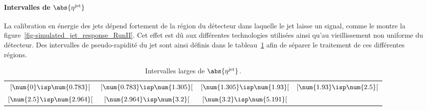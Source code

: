 \paragraph{Intervalles de $\abs{\eta^\text{jet}}$}
La calibration en énergie des jets dépend fortement de la région du détecteur dans laquelle le jet laisse un signal, comme le montre la figure~\ref{fig-simulated_jet_response_RunII}.
Cet effet est dû aux différentes technologies utilisées ainsi qu'au vieillissement non uniforme du détecteur.
Des intervalles de pseudo-rapidité du jet sont ainsi définis dans le tableau~\ref{tab-eta_jet_intervalles_large} afin de séparer le traitement de ces différentes régions.
\begin{table}[h]
\centering
\begin{tabular}{cccc}
\toprule
$[\num{0}\isp \num{0.783}[$ & $[\num{0.783}\isp \num{1.305}[$ & $[\num{1.305}\isp \num{1.93}[$ & $[\num{1.93}\isp \num{2.5}[$ \\
$[\num{2.5}\isp \num{2.964}[$ & $[\num{2.964}\isp \num{3.2}[$ & $[\num{3.2}\isp \num{5.191}[$ &  \\
\bottomrule
\end{tabular}
\caption{Intervalles larges de $\abs{\eta^\text{jet}}$.}
\label{tab-eta_jet_intervalles_large}
\end{table}
